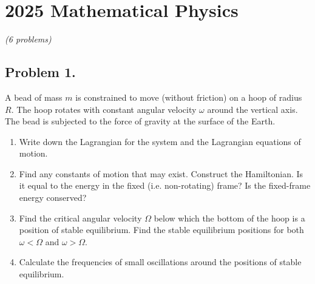 \section{2025 Mathematical Physics}

\textit{(6 problems)}

\subsection*{Problem 1.}

\begin{exercise}
\label{physics:2025:1}
A bead of mass $m$ is constrained to move (without friction) on a hoop of radius $R$. The hoop rotates with constant angular velocity $\omega$ around the vertical axis. The bead is subjected to the force of gravity at the surface of the Earth.

\begin{enumerate}
    \item Write down the Lagrangian for the system and the Lagrangian equations of motion.
    \item Find any constants of motion that may exist. Construct the Hamiltonian. Is it equal to the energy in the fixed (i.e. non-rotating) frame? Is the fixed-frame energy conserved?
    \item Find the critical angular velocity $\Omega$ below which the bottom of the hoop is a position of stable equilibrium. Find the stable equilibrium positions for both $\omega < \Omega$ and $\omega > \Omega$.
    \item Calculate the frequencies of small oscillations around the positions of stable equilibrium.
\end{enumerate}
\end{exercise}

